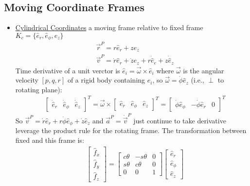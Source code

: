 \documentclass[conference]{IEEEtran}
\begin{document}
\subsection{Moving Coordinate Frames}
\begin{itemize}
\item \underline{Cylindrical Coordinates} a moving frame relative to fixed frame $K_c = \{\hat{e}_r, \hat{e}_\phi, \hat{e}_z\}$ \begin{align*}
    & \vec{r}^P = r \hat{e}_r + z \hat{e}_z \\
    & \vec{v}^P = \dot{r}\hat{e}_r + \dot{z}\hat{e}_z + r \dot{\hat{e}}_e + z \dot{\hat{e}}_z 
    \end{align*}
 Time derivative of a unit verctor is $\hat{e}_i = \vec{\omega} \times \hat{e}_i$ where $\vec{\omega}$ is the angular velocity $[p, q, r]$ of a rigid body containing $\hat{e}_i$, so $\vec{\omega} = \dot{\phi} \hat{e}_z$ (i.e., $\perp$ to rotating plane):
    \begin{align*}
     & \begin{bmatrix} \dot{\hat{e}}_r & \dot{\hat{e}}_\phi & \dot{\hat{e}}_z \end{bmatrix}^T = \vec{\omega} \times \begin{bmatrix} \hat{e}_r & \hat{e}_\phi & \hat{e}_z \end{bmatrix}^T = \begin{bmatrix} \dot{\phi} \hat{e}_\phi & -\dot{\phi} \hat{e}_r & 0 \end{bmatrix}^T
    \end{align*}
    So $\vec{v}^P = \dot{r} \hat{e}_r + r \dot{\phi} \hat{e}_{\phi} + \dot{z}\hat{e}_z$ and $\vec{a}^P = \dot{\vec{v}}^P$ just continue to take derivative leverage the product rule for the rotating frame. The transformation between fixed and this frame is:
    \begin{align*}
     & \begin{bmatrix} \hat{f}_x \\ \hat{f}_y \\ \hat{f}_z \end{bmatrix} = \begin{bmatrix} c\theta & -s\theta & 0 \\ s\theta & c\theta & 0 \\ 0 & 0 & 1 \end{bmatrix} \begin{bmatrix} \hat{e}_r \\ \hat{e}_\phi \\ \hat{e}_z \end{bmatrix}

\end{align*}
\end{itemize}
\end{document}
